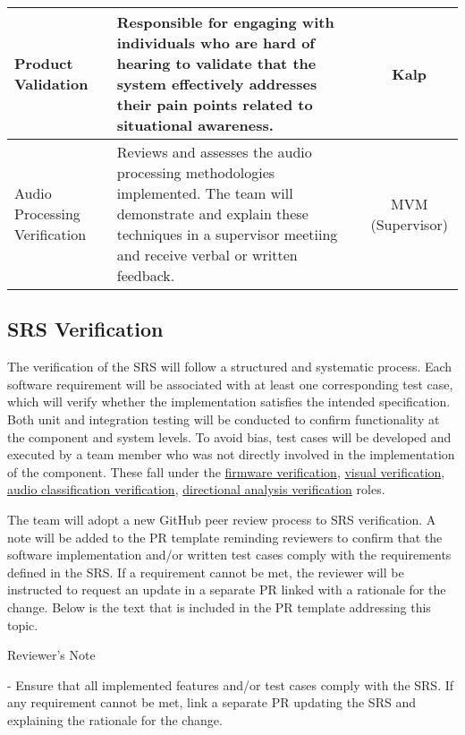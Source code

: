 \documentclass[12pt, titlepage]{article}
\newenvironment{shadedquotation}
    {\begin{shaded*}
     \quoting[leftmargin=0pt, vskip=0pt]}
    {\endquoting
     \end{shaded*}}
\begin{document}
\begin{xltabular}{\textwidth}{|X|X|c|}
  Product Validation \label{role:product_validation} &
  Responsible for engaging with individuals who are hard of hearing to
  validate that the system effectively addresses their pain points related to
  situational awareness. &
  Kalp \\
  \hline

  Audio Processing Verification \label{role:audio_processing_verification}  &
  Reviews and assesses the audio processing methodologies implemented. The
  team will demonstrate and explain these techniques in a supervisor meetiing
  and receive verbal or written feedback. &
  MVM (Supervisor) \\

\end{xltabular}

\subsection{SRS Verification}

The verification of the SRS will follow a structured and systematic process.
Each software requirement will be associated with at least one corresponding
test case, which will verify whether the
implementation satisfies the intended specification. Both unit and integration
testing will be conducted to confirm functionality at the component and system
levels. To avoid bias, test cases will be developed and executed by a team
member who was not directly involved in the implementation of the component.
These fall under the
\hyperref[role:firmware_verfication]{firmware verification},
\hyperref[role:visual_vnv]{visual verification},
\hyperref[role:classification_verfication]{audio classification verification},
\hyperref[role:directional_verfication]{directional analysis verification}
roles. \newline

The team will adopt a new GitHub peer review process to SRS verification. A 
note will be added to the PR template reminding reviewers to confirm that the
software implementation and/or written test cases comply with the requirements
defined in the SRS. If a requirement cannot be met, the reviewer will be
instructed to request an update in a separate PR linked with a rationale for the
change. Below is the text that is included in the PR template addressing this
topic. \newline

\begin{shadedquotation}
Reviewer's Note

- Ensure that all implemented features and/or test cases comply with the SRS.
If any requirement cannot be met, link a separate PR updating the SRS and
explaining the rationale for the change.
\end{shadedquotation}
\end{document}
